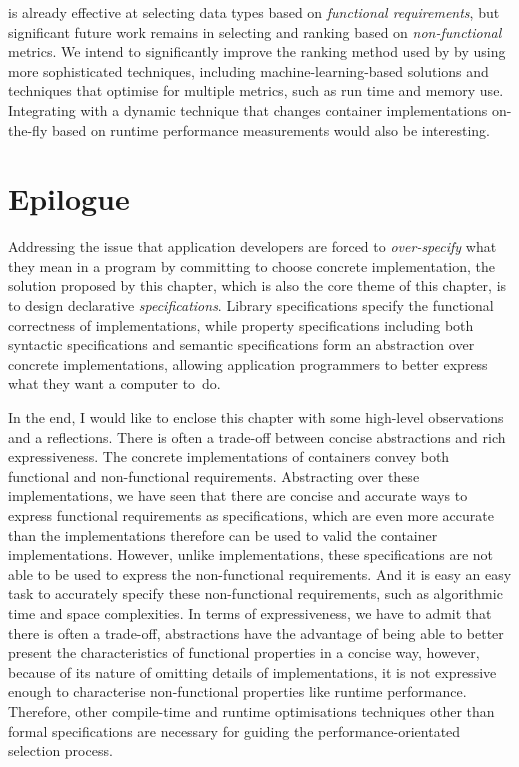 \Primrose{} is already effective at selecting data types based on \emph{functional requirements}, but significant future work remains in selecting and ranking based on \emph{non-functional} metrics. 
We intend to significantly improve the ranking method used by \Primrose{} by using more sophisticated techniques, including machine-learning-based solutions and techniques that optimise for multiple metrics, such as run time and memory use.
Integrating \Primrose{} with a dynamic technique that changes container implementations on-the-fly based on runtime performance measurements would also be interesting.

\section{Epilogue}
\label{chap2:epilogue}
Addressing the issue that application developers are forced to \emph{over-specify} what they mean in a program by committing to choose concrete implementation, the solution proposed by this chapter, which is also the core theme of this chapter, is to design declarative \emph{specifications}. Library specifications specify the functional correctness of implementations, while property specifications including both syntactic specifications and semantic specifications form an abstraction over concrete implementations, allowing application programmers to better express what they want a computer to~do.

In the end, I would like to enclose this chapter with some high-level observations and a reflections.
There is often a trade-off between concise abstractions and rich expressiveness. The concrete implementations of containers convey both functional and non-functional requirements. Abstracting over these implementations, we have seen that there are concise and accurate ways to express functional requirements as specifications, which are even more accurate than the implementations therefore can be used to valid the container implementations. However, unlike implementations, these specifications are not able to be used to express the non-functional requirements. And it is easy an easy task to accurately specify these non-functional requirements, such as algorithmic time and space complexities. In terms of expressiveness, we have to admit that there is often a trade-off, abstractions have the advantage of being able to better present the characteristics of functional properties in a concise way, however, because of its nature of omitting details of implementations, it is not expressive enough to characterise non-functional properties like runtime performance. Therefore, other compile-time and runtime optimisations techniques other than formal specifications are necessary for guiding the performance-orientated selection process.




